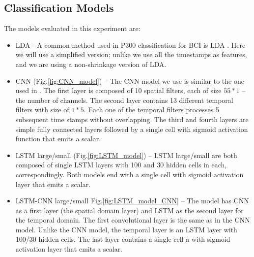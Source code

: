 \documentclass[
12pt, %
english, %
doublespacing, %
headsepline, %
]{MastersDoctoralThesis} %
\begin{document}
\subsection{Classification Models}
The models evaluated in this experiment are:
\begin{itemize}
	\item LDA - A common method used in P300 classification for BCI is LDA \cite{BlaknertzExperiment,P300_Tutorial}. Here we will use a simplified version; unlike \cite{BlaknertzExperiment} we use all the timestamps as features, and we are using a non-shrinkage version of LDA.

	
	\item CNN (Fig.\ref{fig:CNN_model}) -- The CNN model we use is similar to the one used in \cite{P300_CNN}. The first layer is composed of 10  spatial filters, each of size $55*1$ -- the number of channels. The second layer contains 13 different temporal filters with size of $1*5$. Each one of the temporal filters processes 5 subsequent time stamps without overlapping. The third and fourth layers are simple fully connected layers followed by a single cell with sigmoid activation function that emits a scalar.
	
	\item LSTM large/small (Fig.\ref{fig:LSTM_model}) -- LSTM large/small are both composed of single LSTM layers with 100 and 30 hidden cells in each, correspondingly. Both models end with a single cell with sigmoid activation layer that emits a scalar.
	
	\item LSTM-CNN large/small Fig.\ref{fig:LSTM_model_CNN} -- The model has CNN as a first layer (the spatial domain layer) and LSTM as the second layer for the temporal domain. The first convolutional layer is the same as in the CNN model. Unlike the CNN model, the temporal layer is an LSTM layer with 100/30 hidden cells. The last layer contains a single cell a with sigmoid activation layer that emits a scalar.

\end{itemize}
\end{document}
